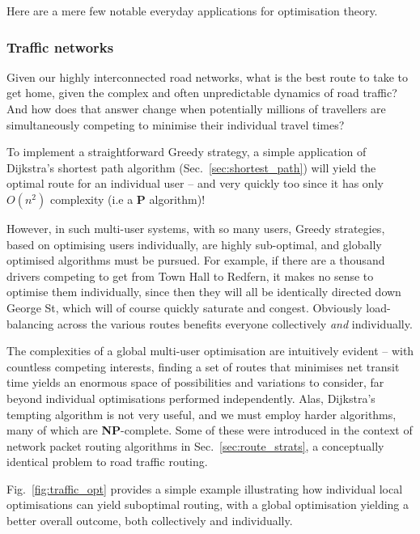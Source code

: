 Here are a mere few notable everyday applications for optimisation theory.

\subsubsection{Traffic networks}

Given our highly interconnected road networks, what is the best route to take to get home, given the  complex and often unpredictable dynamics of road traffic? And how does that answer change when potentially millions of travellers are simultaneously competing to minimise their individual travel times?

To implement a straightforward {\sc Greedy} strategy, a simple application of Dijkstra's shortest path algorithm (Sec.~\ref{sec:shortest_path}) will yield the optimal route for an individual user -- and very quickly too since it has only $O(n^2)$ complexity (i.e a \textbf{P} algorithm)!

However, in such multi-user systems, with so many users, {\sc Greedy} strategies, based on optimising users individually, are highly sub-optimal, and globally optimised algorithms must be pursued. For example, if there are a thousand drivers competing to get from Town Hall to Redfern, it makes no sense to optimise them individually, since then they will all be identically directed down George St, which will of course quickly saturate and congest. Obviously load-balancing across the various routes benefits everyone collectively \textit{and} individually.

The complexities of a global multi-user optimisation are intuitively evident -- with countless competing interests, finding a set of routes that minimises net transit time yields an enormous space of possibilities and variations to consider, far beyond individual optimisations performed independently. Alas, Dijkstra's tempting algorithm is not very useful, and we must employ harder algorithms, many of which are \textbf{NP}-complete. Some of these were introduced in the context of network packet routing algorithms in Sec.~\ref{sec:route_strats}, a conceptually identical problem to road traffic routing.

Fig.~\ref{fig:traffic_opt} provides a simple example illustrating how individual local optimisations can yield suboptimal routing, with a global optimisation yielding a better overall outcome, both collectively and individually.

